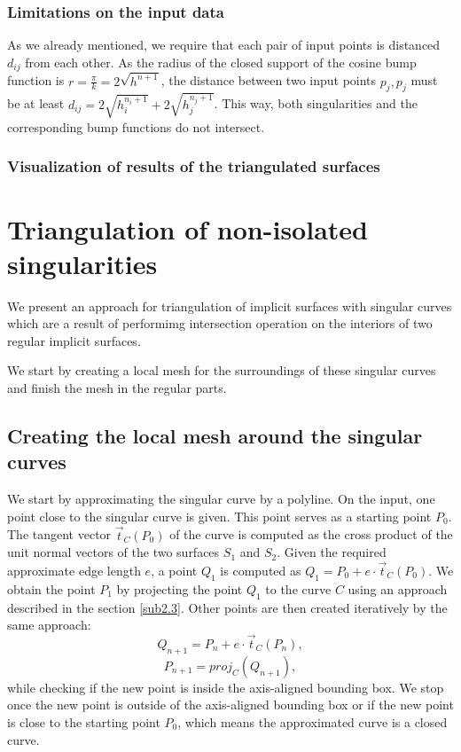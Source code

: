 \subsubsection*{Limitations on the input data}
As we already mentioned, we require that each pair of input points is
distanced $d_{ij}$ from each other. As the radius of the closed support
of the cosine bump function is $r=\frac{\pi}{k}=2\sqrt{h^{n+1}}$, the 
distance between two input points $p_j, p_j$ must be at least
$d_{ij} = 2\sqrt{h_i^{n_i+1}}+2\sqrt{h_j^{n_j+1}}$. This way, both singularities
and the corresponding bump functions do not intersect. 

\subsubsection*{Visualization of results of the triangulated surfaces}

\section{Triangulation of non-isolated singularities}
\label{sub3.3}

We present an approach for triangulation of implicit surfaces with singular
curves which are
a result of performimg intersection operation on the interiors of two
regular implicit surfaces.

We start by creating a local mesh for the surroundings of these singular
curves and finish the mesh in the regular parts.

\subsection{Creating the local mesh around the singular curves}

We start by approximating the singular curve by a polyline.
On the input, one point close to the singular curve is given. This point serves as
a starting point $P_0$. The tangent vector $\vec{t}_C(P_0)$ of the curve is computed as
the cross product of the unit normal vectors of the two surfaces $S_1$ and $S_2$.
Given the required approximate edge length $e$, a point $Q_1$ is computed as
$Q_1 = P_0 + e \cdot \vec{t}_C(P_0)$. We obtain the point $P_1$ by projecting the point 
$Q_1$ to the curve $C$ using an approach described in the section \ref{sub2.3}.
Other points are then created iteratively by the same approach:
$$Q_{n+1} = P_n + e \cdot \vec{t}_C(P_n),$$
$$P_{n+1} = proj_C(Q_{n+1}),$$
while checking if the new point is inside the axis-aligned bounding box.
We stop once the new point is outside of the axis-aligned bounding box or
if the new point is close to the starting point $P_0$, which means the approximated
curve is a closed curve.

